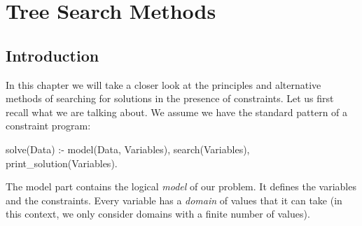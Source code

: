 %
% 
% 
% 
% 

\chapter{Tree Search Methods}
\label{chapsearch}
\section{Introduction}
In this chapter we will take a closer look at the principles and
alternative methods of searching for solutions in the presence of
constraints. Let us first recall what we are talking about.
We assume we have the standard pattern of a constraint program:
\begin{code}
solve(Data) :-
        model(Data, Variables),
        search(Variables),
        print_solution(Variables).
\end{code}
The model part contains the logical {\em model} of our problem. It defines
the variables and the constraints.
Every variable has a {\em domain} of values that it can take
(in this context, we only consider domains with a finite number of values).


